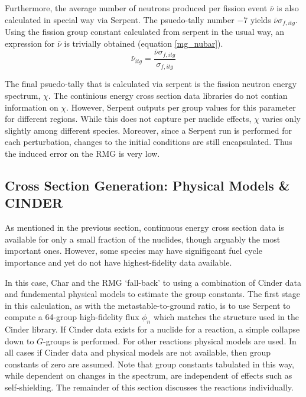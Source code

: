 Furthermore, the average number of neutrons produced per fission event $\bar{\nu}$ is also 
calculated in special way via Serpent.  The psuedo-tally number $-7$ yields $\bar{\nu}\sigma_{f,itg}$.
Using the fission group constant calculated from serpent in the usual way, an expression for $\bar{\nu}$
is trivially obtained (equation \ref{mg_nubar}).
\begin{equation}
\label{mg_nubar}
\bar{\nu}_{itg} = \frac{\bar{\nu}\sigma_{f,itg}}{\sigma_{f,itg}}
\end{equation}

The final psuedo-tally that is calculated via serpent is the fission neutron energy spectrum, $\chi$.
The continious energy cross section data libraries do not contian information on $\chi$.  However, 
Serpent outputs per group values for this parameter for different regions.  While this does not 
capture per nuclide effects, $\chi$ varies only slightly among different species.  
Moreover, since a Serpent run is performed for each perturbation, changes to 
the initial conditions are still encapsulated.  Thus the induced error on the RMG is very low.


\subsection{Cross Section Generation: Physical Models \& CINDER}
As mentioned in the previous section, continuous energy cross section data is available for only 
a small fraction of the nuclides, though arguably the most important ones.  However, some species 
may have signifigcant fuel cycle importance and yet do not have highest-fidelity data available.

In this case, Char and the RMG `fall-back' to using a combination of Cinder data and fundemental 
physical models to estimate the group constants. The first stage in this calculation, as with the 
metastable-to-ground ratio, is to use Serpent to compute a 64-group high-fidelity flux $\phi_n$
which matches the structure used in the Cinder library.  If Cinder data exists for a nuclide for 
a reaction, a simple collapse down to $G$-groups is performed.  For other reactions physical
models are used.  In all cases if Cinder data and physical models are not available, then group
constants of zero are assumed.  Note that group constants tabulated in this way, while dependent 
on changes in the spectrum, are independent of effects such as self-shielding.
The remainder of this section discusses the reactions individually.

